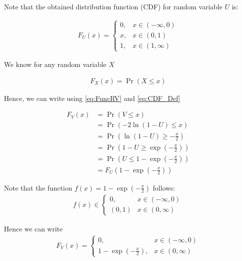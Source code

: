 \documentclass[journal,12pt,twocolumn]{IEEEtran}
\renewcommand\thesection{\arabic{section}}
\begin{document}
\begin{enumerate}[label=\thesection.\arabic*
,ref=\thesection.\theenumi]
	Note that the obtained distribution function (CDF) for random variable $U$ is:

	\begin{align}
		F_U(x) = 
		\begin{cases}
			0, & x \in (-\infty, 0) \\
			x, & x \in (0, 1) \\
			1, & x \in (1, \infty)
		\end{cases}
		\label{eq:CDF_U}
	\end{align}

We know for any random variable $X$

	\begin{align}
		F_X(x) = \Pr(X \leq x)
		\label{eq:CDF_Def}
	\end{align}

	Hence, we can write using \eqref{eq:FuncRV} and \eqref{eq:CDF_Def}

	\begin{align}
		F_V(x) &= \Pr(V \leq x) \\
		&= \Pr(-2\ln{(1 - U)} \leq x)\\
		&= \Pr(\ln{(1 - U)} \geq -\frac{x}{2}) \\
		&= \Pr(1 - U \geq \exp{\left(-\frac{x}{2}\right)}) \\
		&= \Pr(U \leq 1 - \exp{\left(-\frac{x}{2}\right)}) \\
		&= F_U(1 - \exp{\left(-\frac{x}{2}\right)}) 
		\label{eq:CDF_Rel}
	\end{align}

Note that the function $f(x) = 1 - \exp{\left(-\frac{x}{2}\right)}$ follows:
	\begin{align}
		f(x) \in
		\begin{cases}
			{0}, & x \in (-\infty, 0) \\
			(0, 1) & x \in (0, \infty)
		\end{cases}
	\end{align}

	Hence we can write
	\begin{align}
		F_V(x) = 
		\begin{cases}
			0, & x \in (-\infty, 0) \\
			1 - \exp{\left(-\frac{x}{2}\right)}, & x \in (0, \infty)
    		\end{cases}
	\end{align}

%
\end{enumerate}
\end{document}
